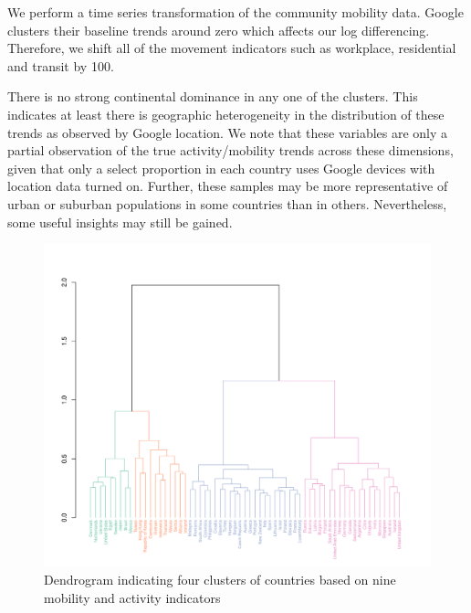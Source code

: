 \documentclass[titlepage,oneside,12pt]{article}
\newcommand{\?}{\stackrel{?}{=}}
\begin{document}
We perform a time series transformation of the community mobility data. Google clusters their baseline trends around zero which affects our log differencing.
Therefore, we shift all of the movement indicators such as workplace, residential and transit by 100.

There is no strong continental dominance in any one of the clusters.
This indicates at least there is geographic heterogeneity in the distribution of these trends as observed by Google location.
We note that these variables are only a partial observation of the true activity/mobility trends across these dimensions, given that only a select proportion in each country uses Google devices with location data turned on.
Further, these samples may be more representative of urban or suburban populations in some countries than in others.
Nevertheless, some useful insights may still be gained.

\begin{figure}[h!]
  \includegraphics[width=\textwidth,trim={0cm 0 1.9cm 7cm},clip]{dendrogram}
  \caption{Dendrogram indicating four clusters of countries based on nine mobility and activity indicators}
  \label{fig:dend}
\end{figure}
\end{document}
